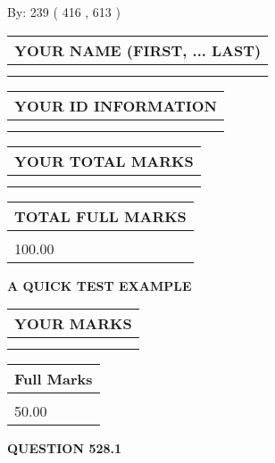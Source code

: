 \documentclass[12pt]{article}
\begin{document}
   
\hspace{1.0in} By: 
 239 ( 416 ,  613 )
   
   
   
   
\newpage 
\setcounter{page}{ 
   528001 } 
   
   
   
   
\noindent\begin{tabular}{|l|}
\hline
YOUR NAME (FIRST, ... LAST)  \\
\hline
 \\ 
 \\ 
\hline
\end{tabular}
\hspace{0.05in} \begin{tabular}{|l|}
\hline
 YOUR   ID   INFORMATION  \\
\hline
 \\ 
 \\ 
\hline
\end{tabular}
   
   
\vspace{0.2in}\noindent\begin{tabular}{|l|}
\hline
YOUR TOTAL MARKS  \\
\hline
 \\ 
 \\ 
\hline
\end{tabular}
\hspace{0.05in} \begin{tabular}{|l|}
\hline
TOTAL FULL MARKS  \\
\hline
 \\ 
100.00 \\
\hline
\end{tabular}
   
   
 \vspace{0.2in}
{\LARGE {\textbf{ A QUICK TEST EXAMPLE}}}
   
   
  
\vspace{0.2in}
  
\noindent\begin{tabular}{|l|}
\hline
 YOUR MARKS  \\
\hline
 \\ 
 \\ 
\hline
\end{tabular}
\hspace{0.05in} \begin{tabular}{|l|}
\hline
 Full Marks  \\
\hline
 \\ 
50.00 \\
\hline
\end{tabular}
{\textbf{\Large{QUESTION
528.1 
}}}
  
\end{document}
